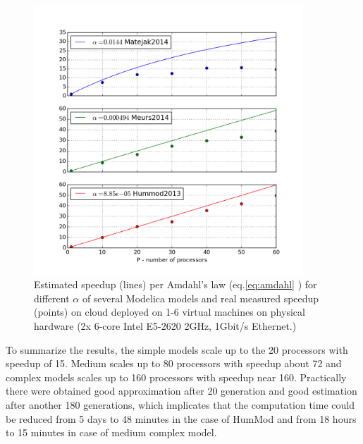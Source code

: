 \begin{figure}[htb]
    \centering
    \includegraphics[width=0.9\textwidth]{chapter7/speedup.png}
    \caption{Estimated speedup (lines) per Amdahl's law (eq.\ref{eq:amdahl} \cite{Amdahl1967}) for different $\alpha$ of several Modelica models and real measured speedup (points) on cloud deployed on 1-6 virtual machines on physical hardware (2x 6-core Intel E5-2620 2GHz, 1Gbit/s Ethernet.)  }
    \label{fig:amdahlres}
\end{figure}

To summarize the results, the simple models scale up to the 20 processors with speedup of 15. Medium scales up to 80 processors with speedup about 72 and complex models scales up to 160 processors with speedup near 160. Practically there were obtained good approximation after 20 generation and good estimation after another 180 generations, which implicates that the computation time could be reduced from 5 days to 48 minutes in the case of HumMod and from 18 hours to 15 minutes in case of medium complex model.

